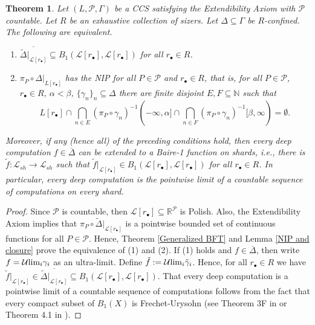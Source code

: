 \documentclass[psamsfonts]{amsart}
\newtheorem{thm}{Theorem}[section]
\theoremstyle{definition}
\theoremstyle{remark}
\numberwithin{equation}{section}
\begin{document}
\begin{thm}\label{nip-baire1def}
    Let $(L,\mathcal P,\Gamma)$ be a CCS satisfying the Extendibility Axiom with $\mathcal{P}$ countable. Let $R$ be an exhaustive collection of sizers. Let $\Delta\subseteq\Gamma$ be $R$-confined. The following are equivalent.

    \begin{enumerate}
        \item $\overline{\tilde\Delta|_{\mathcal{L}[r_\bullet]}}\subseteq B_1(\mathcal L[r_\bullet],\mathcal L[r_\bullet])$ for all $r_\bullet\in R$.
        \item $\pi_P\circ \Delta|_{L[r_\bullet]}$ has the NIP for all $P\in\mathcal{P}$ and $r_\bullet\in R$, that is, for all $P\in\mathcal P$, $r_\bullet\in R$, $\alpha<\beta$, $\{\gamma_n\}_n\subseteq\Delta$ there are finite disjoint $E,F\subseteq\mathbb N$ such that $$L[r_\bullet]\cap\bigcap_{n\in E}(\pi_P\circ\gamma_n)^{-1}(-\infty,\alpha]\cap\bigcap_{n\in F}(\pi_P\circ\gamma_n)^{-1}[\beta,\infty)=\emptyset.$$
    \end{enumerate}

    Moreover, if any (hence all) of the preceding conditions hold, then every deep computation $f\in\overline{\Delta}$ can be extended to a Baire-1 function on shards, i.e., there is $\tilde f:\mathcal L_{sh}\rightarrow \mathcal L_{sh}$ such that $\tilde f|_{\mathcal L[r_\bullet]}\in B_1(\mathcal L[r_\bullet],\mathcal L[r_\bullet])$ for all $r_{\bullet}\in R$. In particular, every deep computation is the pointwise limit of a countable sequence of computations on every shard.
\end{thm}

\begin{proof}
    Since $\mathcal{P}$ is countable, then $\mathcal{L}[r_\bullet]\subseteq\mathbb{R}^\mathcal{P}$ is Polish. Also, the Extendibility Axiom implies that $\pi_P\circ \tilde\Delta|_{\mathcal{L}[r_\bullet]}$ is a pointwise bounded set of continuous functions for all $P\in\mathcal{P}$. Hence, Theorem \ref{Generalized BFT} and Lemma \ref{NIP and closure} prove the equivalence of (1) and (2). If (1) holds and $f\in\overline{\Delta}$, then write $f=\mathcal{U}{\rm lim}_i \gamma_i$ as an ultra-limit. Define $\tilde f:=\mathcal{U}{\rm lim}_i \tilde\gamma_i$. Hence, for all $r_\bullet\in R$ we have $\tilde f|_{\mathcal{L}[r_\bullet]}\in\overline{\tilde\Delta|_{\mathcal{L}[r_\bullet]}}\subseteq B_1(\mathcal L[r_\bullet],\mathcal L[r_\bullet])$. That every deep computation is a pointwise limit of a countable sequence of computations follows from the fact that every compact subset of $B_1(X)$ is Frechet-Urysohn (see Theorem 3F in \cite{BFT_1978_PCompactBaire} or Theorem 4.1 in \cite{debs2013rosenthal}).
\end{proof}
\end{document}
